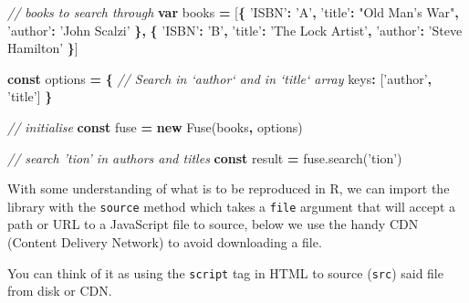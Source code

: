 \documentclass[10pt,]{krantz}
\makeatletter
\newenvironment{Shaded}{\begin{snugshade}}{\end{snugshade}}
\newcommand{\AttributeTok}[1]{\textcolor[rgb]{0.61,0.61,0.61}{#1}}
\newcommand{\CommentTok}[1]{\textcolor[rgb]{0.37,0.37,0.37}{\textit{#1}}}
\newcommand{\DataTypeTok}[1]{\textcolor[rgb]{0.27,0.27,0.27}{#1}}
\newcommand{\KeywordTok}[1]{\textcolor[rgb]{0.27,0.27,0.27}{\textbf{#1}}}
\newcommand{\NormalTok}[1]{#1}
\newcommand{\OperatorTok}[1]{\textcolor[rgb]{0.43,0.43,0.43}{\textbf{#1}}}
\newcommand{\StringTok}[1]{\textcolor[rgb]{0.5,0.5,0.5}{#1}}
\newcommand{\VariableTok}[1]{\textcolor[rgb]{0,0,0}{#1}}
\newenvironment{kframe}{%
\medskip{}
\setlength{\fboxsep}{.8em}
 \def\at@end@of@kframe{}%
 \ifinner\ifhmode%
  \def\at@end@of@kframe{\end{minipage}}%
  \begin{minipage}{\columnwidth}%
 \fi\fi%
 \def\FrameCommand##1{\hskip\@totalleftmargin \hskip-\fboxsep
 \colorbox{shadecolor}{##1}\hskip-\fboxsep
     \hskip-\linewidth \hskip-\@totalleftmargin \hskip\columnwidth}%
 \MakeFramed {\advance\hsize-\width
   \@totalleftmargin\z@ \linewidth\hsize
   \@setminipage}}%
 {\par\unskip\endMakeFramed%
 \at@end@of@kframe}
\renewenvironment{Shaded}{\begin{kframe}}{\end{kframe}}
\makeatother
\begin{document}
\begin{Shaded}
\begin{Highlighting}[]
\CommentTok{// books to search through}
\KeywordTok{var}\NormalTok{ books }\OperatorTok{=}\NormalTok{ [}\OperatorTok{\{}
  \StringTok{'ISBN'}\OperatorTok{:} \StringTok{'A'}\OperatorTok{,}
  \StringTok{'title'}\OperatorTok{:} \StringTok{"Old Man's War"}\OperatorTok{,}
  \StringTok{'author'}\OperatorTok{:} \StringTok{'John Scalzi'}
\OperatorTok{\},} \OperatorTok{\{}
  \StringTok{'ISBN'}\OperatorTok{:} \StringTok{'B'}\OperatorTok{,}
  \StringTok{'title'}\OperatorTok{:} \StringTok{'The Lock Artist'}\OperatorTok{,}
  \StringTok{'author'}\OperatorTok{:} \StringTok{'Steve Hamilton'}
\OperatorTok{\}}\NormalTok{]}

\KeywordTok{const}\NormalTok{ options }\OperatorTok{=} \OperatorTok{\{}
  \CommentTok{// Search in `author` and in `title` array}
  \DataTypeTok{keys}\OperatorTok{:}\NormalTok{ [}\StringTok{'author'}\OperatorTok{,} \StringTok{'title'}\NormalTok{]}
\OperatorTok{\}}

\CommentTok{// initialise}
\KeywordTok{const}\NormalTok{ fuse }\OperatorTok{=} \KeywordTok{new} \AttributeTok{Fuse}\NormalTok{(books}\OperatorTok{,}\NormalTok{ options)}

\CommentTok{// search 'tion' in authors and titles}
\KeywordTok{const}\NormalTok{ result }\OperatorTok{=} \VariableTok{fuse}\NormalTok{.}\AttributeTok{search}\NormalTok{(}\StringTok{'tion'}\NormalTok{)}
\end{Highlighting}
\end{Shaded}

With some understanding of what is to be reproduced in R, we can import the library with the \texttt{source} method which takes a \texttt{file} argument that will accept a path or URL to a JavaScript file to source, below we use the handy CDN (Content Delivery Network) to avoid downloading a file.

\begin{Shaded}
\end{Shaded}

You can think of it as using the \texttt{script} tag in HTML to source (\texttt{src}) said file from disk or CDN.
\end{document}
